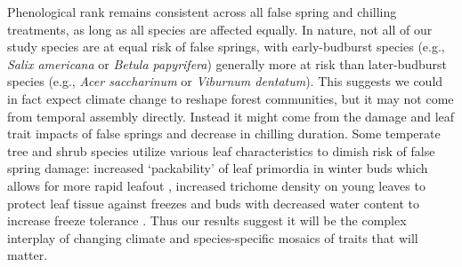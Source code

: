 \documentclass{article}\usepackage[]{graphicx}\usepackage[]{color}
\begin{document}
Phenological rank remains consistent across all false spring and chilling treatments, as long as all species are affected equally. In nature, not all of our study species are at equal risk of false springs, with early-budburst species (e.g., \textit{Salix americana} or \textit{Betula papyrifera}) generally more at risk than later-budburst species (e.g., \textit{Acer saccharinum} or \textit{Viburnum dentatum}). This suggests we could in fact expect climate change to reshape forest communities, but it may not come from temporal assembly directly. Instead it might come from the damage and leaf trait impacts of false springs and decrease in chilling duration. Some temperate tree and shrub species utilize various leaf characteristics to dimish risk of false spring damage: increased `packability' of leaf primordia in winter buds which allows for more rapid leafout \citep{Edwards2017}, increased trichome density on young leaves to protect leaf tissue against freezes \citep{Agrawal2004, Prozherina2003} and buds with decreased water content to increase freeze tolerance \citep{Beck2007, Hofmann2015, Kathke2011, Morin2007,  Muffler2016, Nielsen2009, Poirier2010}. Thus our results suggest it will be the complex interplay of changing climate and species-specific mosaics of traits that will matter. 
\end{document}
